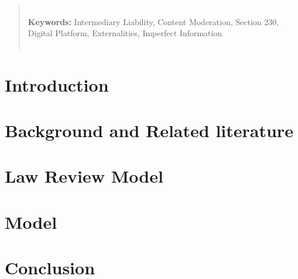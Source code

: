 \documentclass[openbib,12pt]{article}  %
\begin{document}
\begin{abstract}
\vspace{0in}\\
\noindent\textbf{Keywords:} Intermediary Liability, Content Moderation, Section 230, Digital Platform, Externalities, Imperfect Information \\
\vspace{0in}\\
\bigskip
\end{abstract}

\newpage

\section{Introduction}\label{EMIL_Section:intro}


\section{Background and Related literature}\label{EMIL_Section:inst}



\section{Law Review Model}\label{EMIL_Section:lawreview}


\section{Model}\label{EMIL_Section:model}


%

\section{Conclusion}\label{EMIL_Section:conclude}


\newpage
\appendix
\label{Appendix:proofs}
\end{document}

